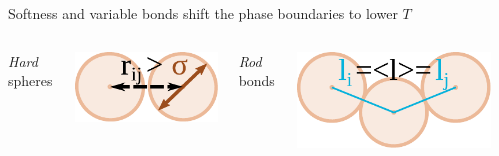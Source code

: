 \documentclass[aspectratio=169]{beamer}
\begin{document}
\begin{frame}[c]{Softness and variable bonds shift the phase boundaries to lower $T$}

  \begin{columns}[T]


  \vspace{1.3\baselineskip}

    \begin{columns}[T]


      \centering

      \textcolor{FigGreen}{\Large \emph{Hard} spheres}
      \vspace{.5\baselineskip}

      \includegraphics[scale=0.65]{../figures/fig-all_potentials/fig-pairs/fig-pair_hard.pdf}


      \centering
      \textcolor{FigOrange}{\Large \emph{Rod} bonds}
      \vspace{.5\baselineskip}

      \includegraphics[scale=0.65]{../figures/fig-all_potentials/fig-bonds/fig-bond_rod.pdf}

    \end{columns}

    \vspace{1.3\baselineskip}

    \begin{columns}[T]



\end{columns}
\end{columns}
\end{frame}
\end{document}
